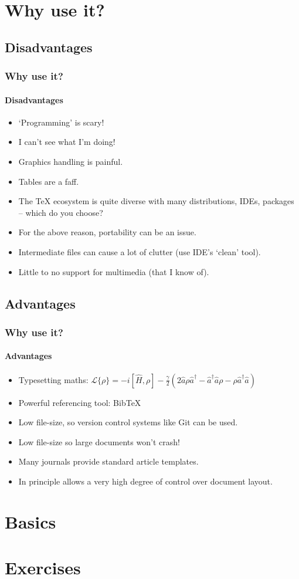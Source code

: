 \documentclass{beamer}
\begin{document}
\section{Why use it?}

\subsection[Cons]{Disadvantages}
\begin{frame}
\frametitle{Why use it?}
\framesubtitle{Disadvantages}

\begin{itemize}
\item `Programming' is scary!
\item I can't see what I'm doing!
\item Graphics handling is painful.
\item Tables are a faff.
\item The TeX ecosystem is quite diverse with many distributions, IDEs, packages -- which do you choose?
\item For the above reason, portability can be an issue.
\item Intermediate files can cause a lot of clutter (use IDE's `clean' tool).
\item Little to no support for multimedia (that I know of).
\end{itemize}
\end{frame}

\subsection[Pros]{Advantages}
\begin{frame}
\frametitle{Why use it?}
\framesubtitle{Advantages}

\begin{itemize}
\item Typesetting maths: \(\mathcal{L}\{\rho\} = -i[\hat{H}, \rho] - \frac{\gamma}{2}\left(2 \hat{a}\rho\hat{a}^{\dagger} - \hat{a}^{\dagger}\hat{a}\rho - \rho\hat{a}^{\dagger}\hat{a}\right)\)
\item Powerful referencing tool: BibTeX
\item Low file-size, so version control systems like Git can be used.
\item Low file-size so large documents won't crash!
\item Many journals provide standard article templates.
\item In principle allows a very high degree of control over document layout.
\end{itemize}
\end{frame}

\section{Basics}
\begin{frame}
\end{frame}

\section{Exercises}
\begin{frame}
\end{frame}
\end{document}
